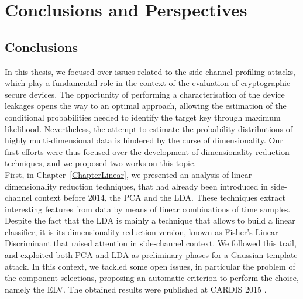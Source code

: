 
\chapter{Conclusions and Perspectives} %

\label{ChapterConclusions}



\section{Conclusions}
In this thesis, we focused over issues related to the side-channel profiling attacks, which play a fundamental role in the context of the evaluation of cryptographic secure devices. The opportunity of performing a characterisation of the device leakages opens the way to an optimal approach, allowing the estimation of the conditional probabilities needed to identify the target key through maximum likelihood. Nevertheless, the attempt to estimate the probability distributions of highly multi-dimensional data is hindered by the curse of dimensionality. Our first efforts were thus
focused over the development of dimensionality reduction techniques, and we proposed two works on this topic.\\
 
First, in Chapter~\ref{ChapterLinear}, we presented an analysis of linear dimensionality reduction techniques, that had already been introduced in side-channel context before 2014, the PCA and the LDA. These techniques extract interesting features from data by means of linear combinations of time samples. Despite the fact that the LDA is mainly a technique that allows to build a linear classifier, it is its dimensionality reduction version, known as Fisher's Linear Discriminant that raised attention in side-channel context. We followed this trail, and exploited both PCA and LDA as preliminary phases for a Gaussian template attack. In this context, we tackled some open issues, in particular the problem of the component selections, proposing an automatic criterion to perform the choice, namely the ELV.  The obtained results were published at CARDIS 2015 \cite{Cagli2016}.\\

